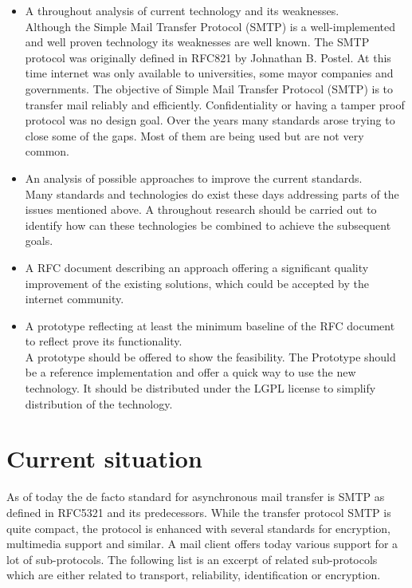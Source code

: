 \documentclass[11pt,a4paper]{book}
\begin{document}
\begin{itemize}
  \item A throughout analysis of current technology and its weaknesses.\\
	      Although the Simple Mail Transfer Protocol (SMTP) is a well-implemented and well proven technology its weaknesses are well known. The SMTP protocol was originally defined in RFC821\cite{RFC821} by Johnathan B. Postel. At this time internet was only available to universities, some mayor companies and governments. The objective of Simple Mail Transfer Protocol (SMTP) is to transfer mail reliably and efficiently\cite[p.~1]{RFC821}. Confidentiality or having a tamper proof protocol was no design goal. Over the years many standards arose trying to close some of the gaps. Most of them are being used but are not very common. 
	\item An analysis of possible approaches to improve the current standards.\\
	      Many standards and technologies do exist these days addressing parts of the issues mentioned above. A throughout research should be carried out to identify how can these technologies be combined to achieve the subsequent goals.
	\item A RFC document describing an approach offering a significant quality improvement of the existing solutions, which could be accepted by the internet community.
	\item A prototype reflecting at least the minimum baseline of the RFC document to reflect prove its functionality.\\
	      A prototype should be offered to show the feasibility. The Prototype should be a reference implementation and offer a quick way to use the new technology. It should be distributed under the LGPL license to simplify distribution of the technology. 
\end{itemize}

\chapter{Current situation}
As of today the de facto standard for asynchronous mail transfer is SMTP as defined in RFC5321\cite{RFC5321} and its predecessors. While the transfer protocol SMTP is quite compact, the protocol is enhanced with several standards for encryption, multimedia support and similar. A mail client offers today various support for a lot of sub-protocols. The following list is an excerpt of related sub-protocols which are either related to transport, reliability, identification or encryption. 
\end{document}
